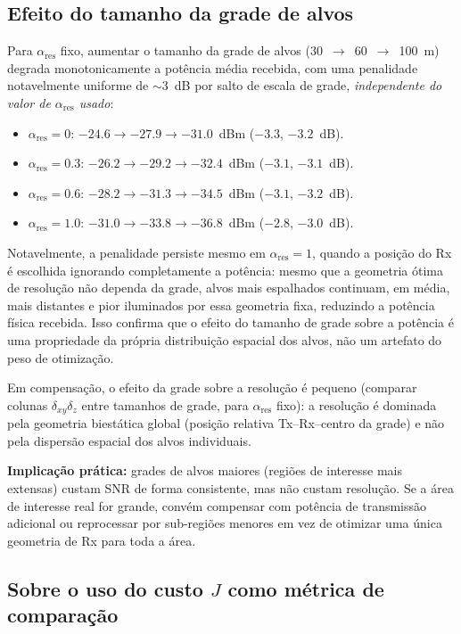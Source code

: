 \documentclass[11pt, a4paper]{article}
\newcommand{\dxy}{\delta_{xy}}
\newcommand{\dz}{\delta_z}
\newcommand{\alphares}{\alpha_{\mathrm{res}}}
\begin{document}
\subsection{Efeito do tamanho da grade de alvos}

Para $\alphares$ fixo, aumentar o tamanho da grade de alvos (30~$\to$~60~$\to$~100~m)
degrada monotonicamente a potência média recebida, com uma penalidade
notavelmente uniforme de $\sim\!3$~dB por salto de escala de grade,
\emph{independente do valor de $\alphares$ usado}:

\begin{itemize}
  \item $\alphares=0$: $-24.6 \to -27.9 \to -31.0$~dBm ($-3.3$, $-3.2$~dB).
  \item $\alphares=0.3$: $-26.2 \to -29.2 \to -32.4$~dBm ($-3.1$, $-3.1$~dB).
  \item $\alphares=0.6$: $-28.2 \to -31.3 \to -34.5$~dBm ($-3.1$, $-3.2$~dB).
  \item $\alphares=1.0$: $-31.0 \to -33.8 \to -36.8$~dBm ($-2.8$, $-3.0$~dB).
\end{itemize}

Notavelmente, a penalidade persiste mesmo em $\alphares=1$, quando a posição do
Rx é escolhida ignorando completamente a potência: mesmo que a geometria ótima
de resolução não dependa da grade, alvos mais espalhados continuam, em média,
mais distantes e pior iluminados por essa geometria fixa, reduzindo a potência
física recebida. Isso confirma que o efeito do tamanho de grade sobre a
potência é uma propriedade da própria distribuição espacial dos alvos, não um
artefato do peso de otimização.

Em compensação, o efeito da grade sobre a resolução é pequeno (comparar
colunas $\dxy\dz$ entre tamanhos de grade, para $\alphares$ fixo): a resolução
é dominada pela geometria biestática global (posição relativa Tx--Rx--centro
da grade) e não pela dispersão espacial dos alvos individuais.

\textbf{Implicação prática:} grades de alvos maiores (regiões de interesse mais
extensas) custam SNR de forma consistente, mas não custam resolução. Se a área
de interesse real for grande, convém compensar com potência de transmissão
adicional ou reprocessar por sub-regiões menores em vez de otimizar uma única
geometria de Rx para toda a área.

\subsection{Sobre o uso do custo $J$ como métrica de comparação}
\end{document}
